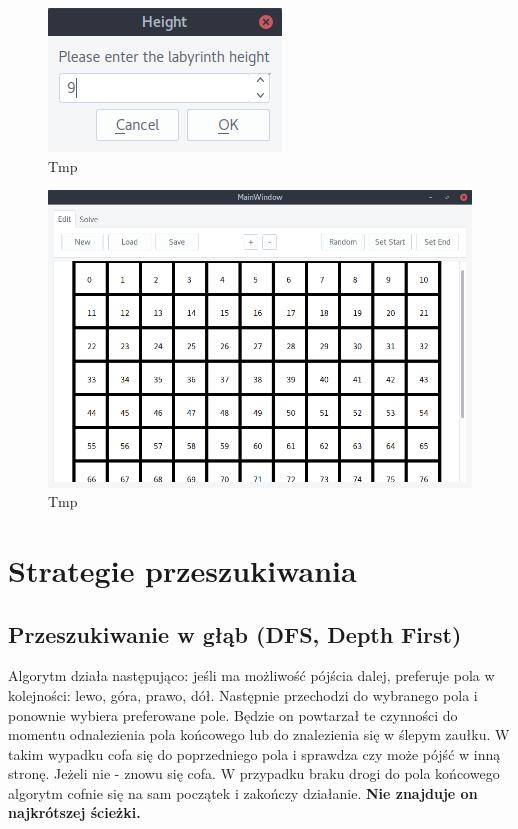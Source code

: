 \documentclass[12pt,a4paper]{article}
\begin{document}
	\begin{figure}[H]
		\centering
		\includegraphics[width=0.8\linewidth]{obrazki/15.png}
		\caption{Tmp}
	\end{figure}
	
	\begin{figure}[H]
		\centering
		\includegraphics[width=0.8\linewidth]{obrazki/16.png}
		\caption{Tmp}
	\end{figure}
	
	\section{Strategie przeszukiwania}
	\subsection{Przeszukiwanie w głąb (DFS, Depth First)}
	Algorytm działa następująco: jeśli ma możliwość pójścia dalej,
	preferuje pola w kolejności: lewo, góra, prawo, dół. Następnie 
	przechodzi do wybranego pola i ponownie wybiera preferowane pole. 
	Będzie on powtarzał te czynności do momentu odnalezienia 
	pola końcowego lub do znalezienia się w ślepym zaułku. W takim	
	wypadku cofa się do poprzedniego pola i sprawdza czy może pójść w 
	inną stronę. Jeżeli nie - znowu się cofa. W przypadku braku
	drogi do pola końcowego algorytm cofnie się na sam początek i
	zakończy działanie. \textbf{Nie znajduje on najkrótszej ścieżki.}
	
\end{document}
